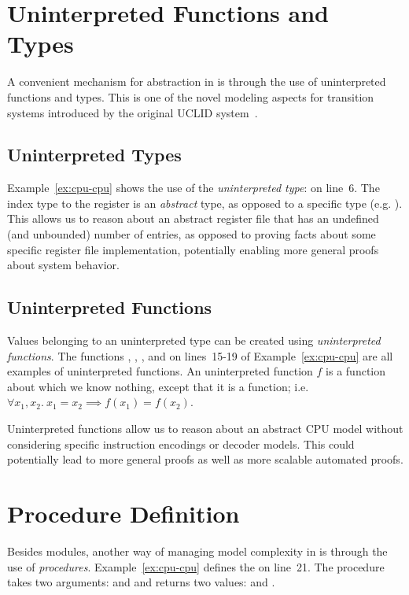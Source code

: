 \section{Uninterpreted Functions and Types}
A convenient mechanism for abstraction in \uclid{} is through the use of uninterpreted functions and types. This is one of the novel modeling
aspects for transition systems introduced by the original UCLID system~\cite{bryant-cav02}.

\subsection{Uninterpreted Types}
Example~\ref{ex:cpu-cpu} shows the use of the \emph{uninterpreted type}:  on line~6. The index type to the register is an \emph{abstract} type, as opposed to a specific type (e.g. ). This allows us to reason about an abstract register file that has an undefined (and unbounded) number of entries, as opposed to proving facts about some specific register file implementation, potentially enabling more general proofs about system behavior.

\subsection{Uninterpreted Functions}
Values belonging to an uninterpreted type can be created using \emph{uninterpreted functions}. The functions , , ,  and  on lines~15-19 of Example~\ref{ex:cpu-cpu} are all examples of uninterpreted functions. An uninterpreted function $f$ is a function about which we know nothing, except that it is a function; i.e. $\forall x_1, x_2.~ x_1 = x_2 \implies f(x_1) = f(x_2)$.

Uninterpreted functions allow us to reason about an abstract CPU model without considering specific instruction encodings or decoder models. This could potentially lead to more general proofs as well as more scalable automated proofs. 


\section{Procedure Definition}
Besides modules, another way of managing model complexity in \uclid{} is through the use of \emph{procedures}. Example~\ref{ex:cpu-cpu} defines the   on line~21. The procedure takes two arguments:  and  and returns two values:  and .

